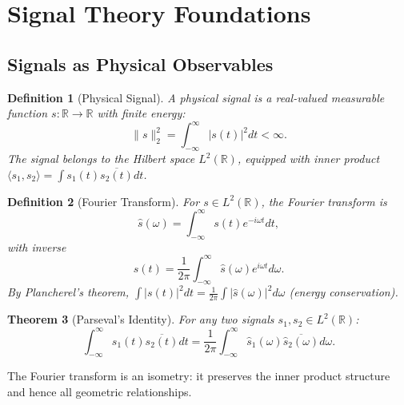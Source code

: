 \documentclass[twocolumn,11pt,a4paper]{article}
\newtheorem{theorem}{Theorem}[section]
\newtheorem{definition}[theorem]{Definition}
\newcommand{\signal}{s}
\newcommand{\freq}{\omega}
\begin{document}
\section{Signal Theory Foundations}
\label{sec:foundations}

\subsection{Signals as Physical Observables}

\begin{definition}[Physical Signal]
A \emph{physical signal} is a real-valued measurable function $\signal: \mathbb{R} \to \mathbb{R}$ with finite energy:
\begin{equation}
  \|\signal\|_2^2 = \int_{-\infty}^{\infty} |\signal(t)|^2 dt < \infty.
  \label{eq:energy}
\end{equation}
The signal belongs to the Hilbert space $L^2(\mathbb{R})$, equipped with inner product $\langle \signal_1, \signal_2 \rangle = \int \signal_1(t) \overline{\signal_2(t)} dt$.
\end{definition}

\begin{definition}[Fourier Transform]
For $\signal \in L^2(\mathbb{R})$, the \emph{Fourier transform} is
\begin{equation}
  \hat{\signal}(\freq) = \int_{-\infty}^{\infty} \signal(t) e^{-i\freq t} dt,
  \label{eq:fourier}
\end{equation}
with inverse
\begin{equation}
  \signal(t) = \frac{1}{2\pi}\int_{-\infty}^{\infty} \hat{\signal}(\freq) e^{i\freq t} d\freq.
  \label{eq:inverse_fourier}
\end{equation}
By Plancherel's theorem, $\int |\signal(t)|^2 dt = \frac{1}{2\pi}\int |\hat{\signal}(\freq)|^2 d\freq$ (energy conservation).
\end{definition}

\begin{theorem}[Parseval's Identity]
For any two signals $\signal_1, \signal_2 \in L^2(\mathbb{R})$:
\begin{equation}
  \int_{-\infty}^{\infty} \signal_1(t) \overline{\signal_2(t)} dt = \frac{1}{2\pi}\int_{-\infty}^{\infty} \hat{\signal}_1(\freq) \overline{\hat{\signal}_2(\freq)} d\freq.
\end{equation}
\end{theorem}

The Fourier transform is an isometry: it preserves the inner product structure and hence all geometric relationships.
\end{document}
